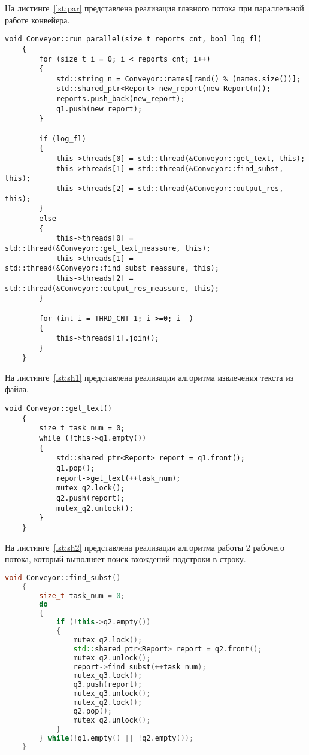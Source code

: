 \clearpage

На листинге~\ref{lst:par} представлена реализация главного потока при параллельной работе конвейера.

\begin{lstlisting}[label=lst:par,caption=Реализация основного потока для конвейерной обработки]
	void Conveyor::run_parallel(size_t reports_cnt, bool log_fl)
	{
		for (size_t i = 0; i < reports_cnt; i++)
		{
			std::string n = Conveyor::names[rand() % (names.size())];
			std::shared_ptr<Report> new_report(new Report(n));
			reports.push_back(new_report);
			q1.push(new_report);
		}
		
		if (log_fl)
		{
			this->threads[0] = std::thread(&Conveyor::get_text, this);
			this->threads[1] = std::thread(&Conveyor::find_subst, this);
			this->threads[2] = std::thread(&Conveyor::output_res, this);
		}
		else
		{
			this->threads[0] = std::thread(&Conveyor::get_text_meassure, this);
			this->threads[1] = std::thread(&Conveyor::find_subst_meassure, this);
			this->threads[2] = std::thread(&Conveyor::output_res_meassure, this);
		}
		
		for (int i = THRD_CNT-1; i >=0; i--)
		{
			this->threads[i].join();
		}
	}    
\end{lstlisting}

На листинге~\ref{lst:sh1} представлена реализация алгоритма извлечения текста из файла.
\begin{lstlisting}[label=lst:sh1,caption=Реализация вспомогательного потока, отвечающего за извлечения текста из файла]
	void Conveyor::get_text()
	{
		size_t task_num = 0;
		while (!this->q1.empty())
		{
			std::shared_ptr<Report> report = q1.front();
			q1.pop();
			report->get_text(++task_num);
			mutex_q2.lock();
			q2.push(report);
			mutex_q2.unlock();
		}
	}
\end{lstlisting}

На листинге~\ref{lst:sh2} представлена реализация алгоритма работы 2 рабочего потока, который выполняет поиск
вхождений подстроки в строку.
\begin{lstlisting}[label=lst:sh2,caption=Реализация вспомогательного потока, отвечающего за поиск подстроки в строке, language=C++]
	void Conveyor::find_subst()
	{
		size_t task_num = 0;
		do
		{
			if (!this->q2.empty())
			{
				mutex_q2.lock();
				std::shared_ptr<Report> report = q2.front();
				mutex_q2.unlock();
				report->find_subst(++task_num);
				mutex_q3.lock();
				q3.push(report);
				mutex_q3.unlock();
				mutex_q2.lock();
				q2.pop();
				mutex_q2.unlock();
			}
		} while(!q1.empty() || !q2.empty());
	}
\end{lstlisting}

